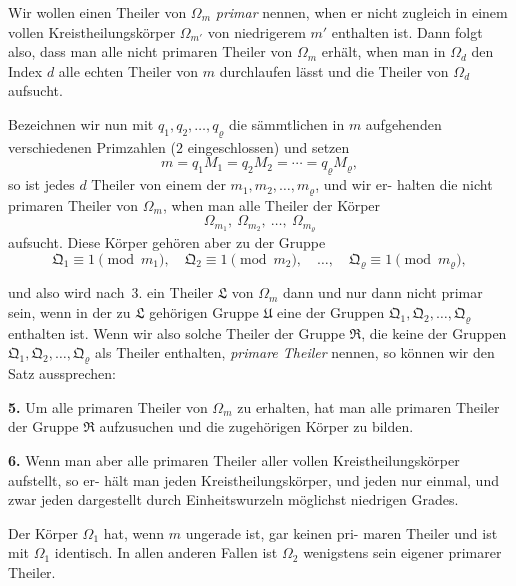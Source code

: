 \documentclass[12pt,a4paper]{article}
\theoremstyle{plain}
\theoremstyle{definition}
\theoremstyle{remark}
\begin{document}
Wir wollen einen Theiler von $\Omega_m$ \emph{primar} nennen, when er
nicht zugleich in einem vollen Kreistheilungskörper $\Omega_{m'}$ von
niedrigerem $m'$ enthalten ist. Dann folgt also, dass man alle
nicht primaren Theiler von $\Omega_m$ erhält, when man in $\Omega_d$ den
Index $d$ alle echten Theiler von $m$ durchlaufen lässt und die
Theiler von $\Omega_d$ aufsucht.

Bezeichnen wir nun mit $q_1, q_2, \ldots, q_\varrho$ die sämmtlichen in $m$
aufgehenden verschiedenen Primzahlen ($2$ eingeschlossen) und
setzen
\begin{equation}\tag{8}
m = q_1 M_1 = q_2 M_2 = \cdots = q_\varrho M_\varrho,
\end{equation}
so ist jedes $d$ Theiler von einem der $m_1, m_2, \ldots, m_\varrho$, und wir er-
halten die nicht primaren Theiler von $\Omega_m$, when man alle Theiler
der Körper
\begin{equation}\tag{9}
\Omega_{m_1}, \ \Omega_{m_2}, \ \ldots, \ \Omega_{m_\varrho}
\end{equation}
aufsucht. Diese Körper gehören aber zu der Gruppe
\begin{equation}\tag{10}
\mathfrak{Q}_1 \equiv 1 \pmod{m_1}, \quad \mathfrak{Q}_2 \equiv 1 \pmod{m_2}, \quad \ldots, \quad \mathfrak{Q}_\varrho \equiv 1 \pmod{m_\varrho},
\end{equation}


und also wird nach~3. ein Theiler $\mathfrak{L}$ von $\Omega_m$ dann und nur
dann nicht primar sein, wenn in der zu $\mathfrak{L}$ gehörigen Gruppe $\mathfrak{U}$
eine der Gruppen $\mathfrak{Q}_1, \mathfrak{Q}_2, \ldots, \mathfrak{Q}_\varrho$ enthalten ist. Wenn wir also
solche Theiler der Gruppe $\mathfrak{R}$, die keine der Gruppen $\mathfrak{Q}_1, \mathfrak{Q}_2, \ldots, \mathfrak{Q}_\varrho$
als Theiler enthalten, \emph{primare Theiler} nennen, so können wir
den Satz aussprechen:

\textbf{5.} Um alle primaren Theiler von $\Omega_m$ zu erhalten,
hat man alle primaren Theiler der Gruppe $\mathfrak{R}$
aufzusuchen und die zugehörigen Körper zu
bilden.

\textbf{6.} Wenn man aber alle primaren Theiler aller
vollen Kreistheilungskörper aufstellt, so er-
hält man jeden Kreistheilungskörper, und jeden
nur einmal, und zwar jeden dargestellt durch
Einheitswurzeln möglichst niedrigen Grades.

Der Körper $\Omega_1$ hat, wenn $m$ ungerade ist, gar keinen pri-
maren Theiler und ist mit $\Omega_1$ identisch. In allen anderen Fallen
ist $\Omega_2$ wenigstens sein eigener primarer Theiler.
\end{document}
